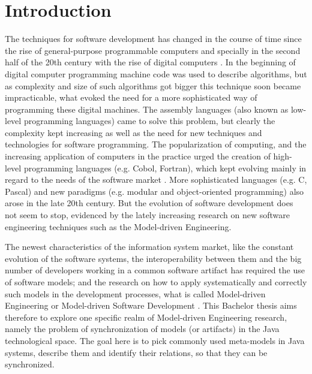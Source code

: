 \documentclass[tuberlin,cic,tc,english,noabntcite]{iiufrgs}
\begin{document}
\tableofcontents

\chapter{Introduction}
The techniques for software development has changed in the course of time since the rise of general-purpose programmable computers and specially in the second half of the 20th century with the rise of digital computers \citep{ceruzzi2003history}. In the beginning of digital computer programming machine code was used to describe algorithms, but as complexity and size of such algorithms got bigger this technique soon became impracticable, what evoked the need for a more sophisticated way of programming these digital machines. The assembly languages (also known as low-level programming languages) came to solve this problem, but clearly the complexity kept increasing as well as the need for new techniques and technologies for software programming. The popularization of computing, and the increasing application of computers in the practice urged the creation of high-level programming languages (e.g. Cobol, Fortran), which kept evolving mainly in regard to the needs of the software market \citep{ceruzzi2003history}. More sophisticated languages (e.g. C, Pascal) and new paradigms (e.g. modular and object-oriented programming) also arose in the late 20th century. But the evolution of software development does not seem to stop, evidenced by the lately increasing research on new software engineering techniques such as the Model-driven Engineering.

The newest characteristics of the information system market, like the constant evolution of the software systems, the interoperability between them and the big number of developers working in a common software artifact has required the use of software models; and the research on how to apply systematically and correctly such models in the development processes, what is called Model-driven Engineering or Model-driven Software Development \cite{france2007model}. This Bachelor thesis aims therefore to explore one specific realm of Model-driven Engineering research, namely the problem of synchronization of models (or artifacts) in the Java technological space. The goal here is to pick commonly used meta-models in Java systems, describe them and identify their relations, so that they can be synchronized.
\end{document}
